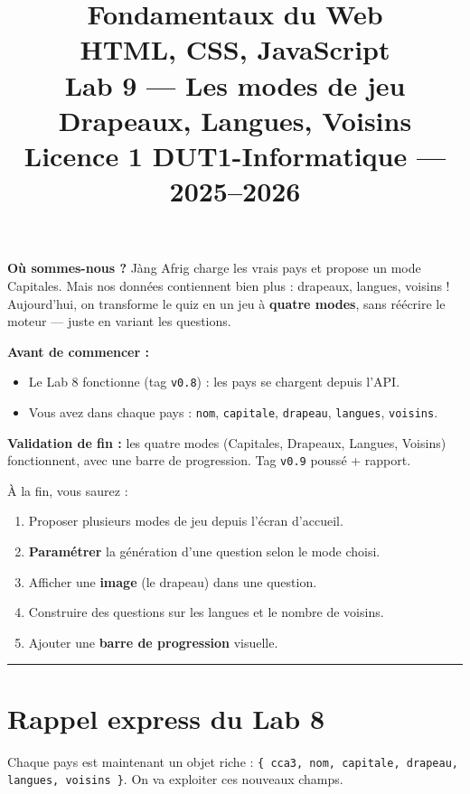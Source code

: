 \documentclass[11pt,a4paper]{article}
\title{%
\vspace{-1cm}
\textbf{\LARGE Fondamentaux du Web}\\
\textbf{\LARGE HTML, CSS, JavaScript}\\[0.8cm]
\textbf{\huge Lab 9 --- Les modes de jeu}\\[0.3cm]
\textbf{\Large Drapeaux, Langues, Voisins}\\[0.5cm]
\large Licence 1 DUT1-Informatique --- 2025--2026}
\date{}
\author{}
\newcommand{\code}[1]{\texttt{#1}}
\begin{document}
\maketitle
\thispagestyle{empty}

\begin{prereqbox}
\textbf{Où sommes-nous ?} Jàng Afrig charge les vrais pays et propose un mode Capitales. Mais nos données contiennent bien plus : drapeaux, langues, voisins ! Aujourd'hui, on transforme le quiz en un jeu à \textbf{quatre modes}, sans réécrire le moteur --- juste en variant les questions.

\smallskip
\textbf{Avant de commencer :}
\begin{itemize}[leftmargin=*,noitemsep]
  \item Le Lab 8 fonctionne (tag \code{v0.8}) : les pays se chargent depuis l'API.
  \item Vous avez dans chaque pays : \code{nom}, \code{capitale}, \code{drapeau}, \code{langues}, \code{voisins}.
\end{itemize}

\smallskip
\textbf{Validation de fin :} les quatre modes (Capitales, Drapeaux, Langues, Voisins) fonctionnent, avec une barre de progression. Tag \code{v0.9} poussé + rapport.
\end{prereqbox}

\begin{objectifbox}
À la fin, vous saurez :
\begin{enumerate}[leftmargin=*,noitemsep]
  \item Proposer plusieurs modes de jeu depuis l'écran d'accueil.
  \item \textbf{Paramétrer} la génération d'une question selon le mode choisi.
  \item Afficher une \textbf{image} (le drapeau) dans une question.
  \item Construire des questions sur les langues et le nombre de voisins.
  \item Ajouter une \textbf{barre de progression} visuelle.
\end{enumerate}
\end{objectifbox}

\tableofcontents
\bigskip\hrule\bigskip

\section*{Rappel express du Lab 8}
Chaque pays est maintenant un objet riche : \code{\{ cca3, nom, capitale, drapeau, langues, voisins \}}. On va exploiter ces nouveaux champs.
\end{document}
